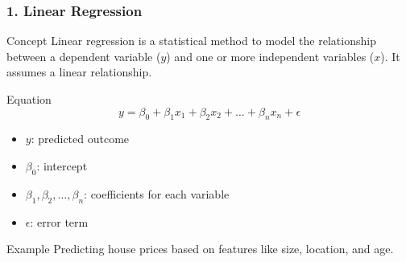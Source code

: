 \documentclass{beamer}
\begin{document}
\begin{frame}[fragile]
    \frametitle{1. Linear Regression}
    \begin{block}{Concept}
        Linear regression is a statistical method to model the relationship between a dependent variable ($y$) and one or more independent variables ($x$). It assumes a linear relationship.
    \end{block}
    
    \begin{block}{Equation}
        \begin{equation}
            y = \beta_0 + \beta_1x_1 + \beta_2x_2 + \ldots + \beta_nx_n + \epsilon
        \end{equation}
        \begin{itemize}
            \item $y$: predicted outcome
            \item $\beta_0$: intercept
            \item $\beta_1, \beta_2, \ldots, \beta_n$: coefficients for each variable
            \item $\epsilon$: error term
        \end{itemize}
    \end{block}

    \begin{block}{Example}
        Predicting house prices based on features like size, location, and age.
    \end{block}
\end{frame}
\end{document}

